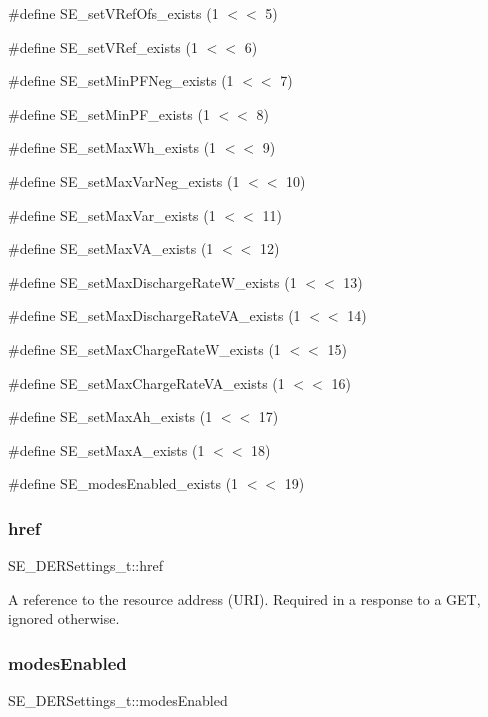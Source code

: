 \#define S\+E\+\_\+set\+V\+Ref\+Ofs\+\_\+exists (1 $<$$<$ 5)

\#define S\+E\+\_\+set\+V\+Ref\+\_\+exists (1 $<$$<$ 6)

\#define S\+E\+\_\+set\+Min\+P\+F\+Neg\+\_\+exists (1 $<$$<$ 7)

\#define S\+E\+\_\+set\+Min\+P\+F\+\_\+exists (1 $<$$<$ 8)

\#define S\+E\+\_\+set\+Max\+Wh\+\_\+exists (1 $<$$<$ 9)

\#define S\+E\+\_\+set\+Max\+Var\+Neg\+\_\+exists (1 $<$$<$ 10)

\#define S\+E\+\_\+set\+Max\+Var\+\_\+exists (1 $<$$<$ 11)

\#define S\+E\+\_\+set\+Max\+V\+A\+\_\+exists (1 $<$$<$ 12)

\#define S\+E\+\_\+set\+Max\+Discharge\+Rate\+W\+\_\+exists (1 $<$$<$ 13)

\#define S\+E\+\_\+set\+Max\+Discharge\+Rate\+V\+A\+\_\+exists (1 $<$$<$ 14)

\#define S\+E\+\_\+set\+Max\+Charge\+Rate\+W\+\_\+exists (1 $<$$<$ 15)

\#define S\+E\+\_\+set\+Max\+Charge\+Rate\+V\+A\+\_\+exists (1 $<$$<$ 16)

\#define S\+E\+\_\+set\+Max\+Ah\+\_\+exists (1 $<$$<$ 17)

\#define S\+E\+\_\+set\+Max\+A\+\_\+exists (1 $<$$<$ 18)

\#define S\+E\+\_\+modes\+Enabled\+\_\+exists (1 $<$$<$ 19) \mbox{\label{group__DERSettings_gad6e6e2ae01c694650bbc075b9b188b83}} 
\subsubsection{\texorpdfstring{href}{href}}
{\footnotesize\ttfamily S\+E\+\_\+\+D\+E\+R\+Settings\+\_\+t\+::href}

A reference to the resource address (U\+RI). Required in a response to a G\+ET, ignored otherwise. \mbox{\label{group__DERSettings_gaecab29deffa8f7119731d05b84fcc071}} 
\subsubsection{\texorpdfstring{modes\+Enabled}{modesEnabled}}
{\footnotesize\ttfamily S\+E\+\_\+\+D\+E\+R\+Settings\+\_\+t\+::modes\+Enabled}

